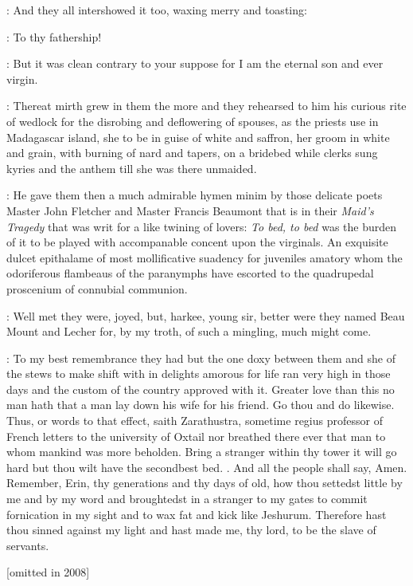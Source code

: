 : And they all intershowed it too, waxing merry and toasting:

\All: To thy fathership!

\stephen: But it was clean contrary to your suppose for I am the
eternal son and ever virgin.

: Thereat mirth grew in them the more and they
rehearsed to him his curious rite of wedlock for the disrobing and
deflowering of spouses, as the priests use in Madagascar island, she to
be in guise of white and saffron, her groom in white and grain, with
burning of nard and tapers, on a bridebed while clerks sung kyries and
the anthem 
till she was there unmaided.

: He gave them then a much admirable hymen minim by those
delicate poets Master John Fletcher and Master Francis Beaumont that is
in their \emph{Maid's Tragedy} that was writ for a like twining of lovers:
\emph{To bed, to bed} was the burden of it to be played with
accompanable concent upon the virginals.
An exquisite dulcet epithalame of most mollificative suadency for
juveniles amatory whom the odoriferous flambeaus of the paranymphs have
escorted to the quadrupedal proscenium of connubial communion.

\dixon: Well met they were, joyed, but, harkee,
young sir, better were they named Beau Mount and Lecher for, by my troth,
of such a mingling, much might come.

\stephen: To my best remembrance they had but the one doxy between them and she
of the stews to make shift with in delights amorous for life ran very high
in those days and the custom of the country approved with it. Greater love
than this no man hath that a man lay down his wife for his friend. Go thou
and do likewise. Thus, or words to that effect, saith Zarathustra,
sometime regius professor of French letters to the university of Oxtail
nor breathed there ever that man to whom mankind was more beholden. Bring
a stranger within thy tower it will go hard but thou wilt have the
secondbest bed. . And all the people
shall say, Amen. Remember, Erin, thy generations and thy days of old, how
thou settedst little by me and by my word and broughtedst in a stranger to
my gates to commit fornication in my sight and to wax fat and kick like
Jeshurum. Therefore hast thou sinned against my light and hast made me,
thy lord, to be the slave of servants.

[omitted in 2008]

